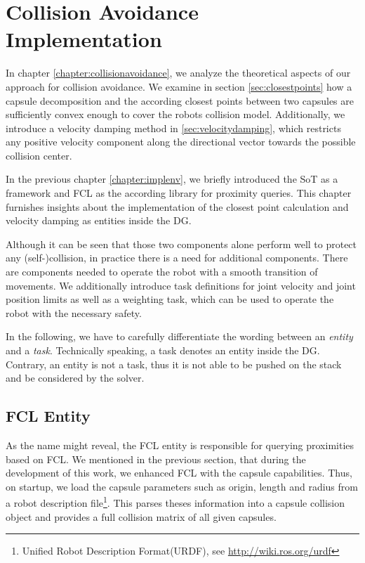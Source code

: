 \chapter{Collision Avoidance Implementation}\label{chapter:collisionavoidanceimpl}
In chapter \ref{chapter:collisionavoidance}, we analyze the theoretical aspects of our approach for collision avoidance. We examine in section \ref{sec:closestpoints} how a capsule decomposition and the according closest points between two capsules are sufficiently convex enough to cover the robots collision model. Additionally, we introduce a velocity damping method in \ref{sec:velocitydamping}, which restricts any positive velocity component along the directional vector towards the possible collision center. 

In the previous chapter \ref{chapter:implenv}, we briefly introduced the SoT as a framework and FCL as the according library for proximity queries. This chapter furnishes insights about the implementation of the closest point calculation and velocity damping as entities inside the DG.

Although it can be seen that those two components alone perform well to protect any (self-)collision, in practice there is a need for additional components. There are components needed to operate the robot with a smooth transition of movements. We additionally introduce task definitions for joint velocity and joint position limits as well as a weighting task, which can be used to operate the robot with the necessary safety.

In the following, we have to carefully differentiate the wording between an \textit{entity} and a \textit{task}. Technically speaking, a task denotes an entity inside the DG. Contrary, an entity is not a task, thus it is not able to be pushed on the stack and be considered by the solver.
\newpage
\section{FCL Entity}
As the name might reveal, the FCL entity is responsible for querying proximities based on FCL. We mentioned in the previous section, that during the development of this work, we enhanced FCL with the capsule capabilities. Thus, on startup, we load the capsule parameters such as origin, length and radius from a robot description file\footnote{Unified Robot Description Format(URDF), see \url{http://wiki.ros.org/urdf}}. This parses theses information into a capsule collision object and provides a full collision matrix of all given capsules. 

